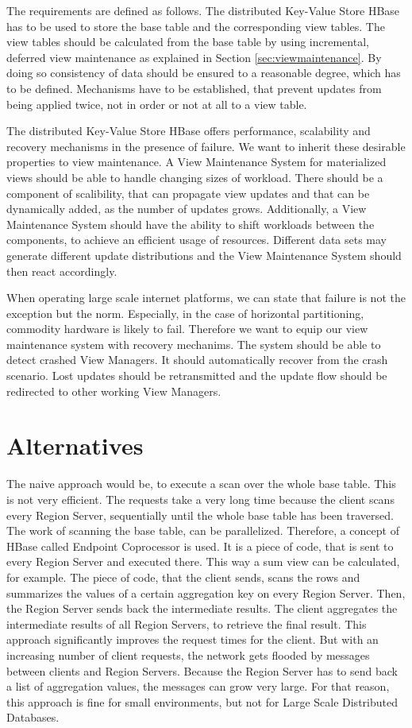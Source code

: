 \documentclass[11pt,a4paper,bibtotoc,idxtotoc,headsepline,footsepline,footexclude,BCOR12mm,DIV13]{scrbook}
\begin{document}
The requirements are defined as follows. The distributed Key-Value Store HBase has to be used to store the base table and the corresponding view tables. The view tables should be calculated from the base table by using incremental, deferred view maintenance as explained in Section \ref{sec:viewmaintenance}. By doing so consistency of data should be ensured to a reasonable degree, which has to be defined. Mechanisms have to be established, that prevent updates from being applied twice, not in order or not at all to a view table.  

The distributed Key-Value Store HBase offers performance, scalability and recovery mechanisms in the presence of failure. We want to inherit these desirable properties to view maintenance. A View Maintenance System for materialized views should be able to handle changing sizes of workload. There should be a component of scalibility, that can propagate view updates and that can be dynamically added, as the number of updates grows. Additionally, a View Maintenance System should have the ability to shift workloads between the components, to achieve an efficient usage of resources. Different data sets may generate different update distributions and the View Maintenance System should then react accordingly.

When operating large scale internet platforms, we can state that failure is not the exception but the norm. Especially, in the case of horizontal partitioning, commodity hardware is likely to fail\cite{chang:bigtable}. Therefore we want to equip our view maintenance system with recovery mechanims. The system should be able to detect crashed View Managers. It should automatically recover from the crash scenario. Lost updates should be retransmitted and the update flow should be redirected to other working View Managers.


\section{Alternatives}
\label{sec:alternatives}

The naive approach would be, to execute a scan over the whole base table. This is not very efficient. The requests take a very long time because the client scans every Region Server, sequentially until the whole base table has been traversed. The work of scanning the base table, can be parallelized. Therefore, a concept  of HBase called Endpoint Coprocessor is used. It is a piece of code, that is sent to every Region Server and executed there. This way a sum view can be calculated, for example. The piece of code, that the client sends, scans the rows and summarizes the values of a certain aggregation key on every Region Server. Then, the Region Server sends back the intermediate results. The client aggregates the intermediate results of all Region Servers, to retrieve the final result. This approach significantly improves the request times for the client. But with an increasing number of client requests, the network gets flooded by messages between clients and Region Servers. Because the Region Server has to send back a list of aggregation values, the messages can grow very large. For that reason, this approach is fine for small environments, but not for Large Scale Distributed Databases.
\end{document}
